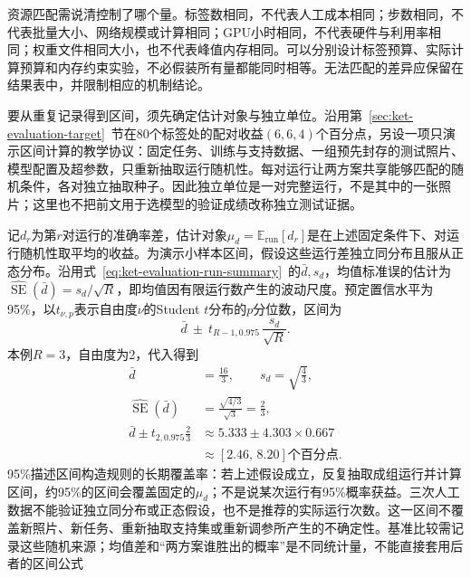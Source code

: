资源匹配需说清控制了哪个量。标签数相同，不代表人工成本相同；步数相同，不代表批量大小、网络规模或计算相同；GPU小时相同，不代表硬件与利用率相同；权重文件相同大小，也不代表峰值内存相同。可以分别设计标签预算、实际计算预算和内存约束实验，不必假装所有量都能同时相等。无法匹配的差异应保留在结果表中，并限制相应的机制结论。

要从重复记录得到区间，须先确定估计对象与独立单位。沿用第~\ref{sec:ket-evaluation-target}~节在80个标签处的配对收益$(6,6,4)$个百分点，另设一项只演示区间计算的教学协议：固定任务、训练与支持数据、一组预先封存的测试照片、模型配置及超参数，只重新抽取运行随机性。每对运行让两方案共享能够匹配的随机条件，各对独立抽取种子。因此独立单位是一对完整运行，不是其中的一张照片；这里也不把前文用于选模型的验证成绩改称独立测试证据。

记$d_r$为第$r$对运行的准确率差，估计对象$\mu_d=\mathbb E_{\mathrm{run}}[d_r]$是在上述固定条件下、对运行随机性取平均的收益。为演示小样本区间，假设这些运行差独立同分布且服从正态分布。沿用式~\eqref{eq:ket-evaluation-run-summary}~的$\bar d,s_d$，均值标准误的估计为$\widehat{\operatorname{SE}}(\bar d)=s_d/\sqrt R$，即均值因有限运行数产生的波动尺度。预定置信水平为95\%，以$t_{\nu,p}$表示自由度$\nu$的Student $t$分布的$p$分位数，区间为
\begin{equation}
  \bar d\ \pm\ t_{R-1,0.975}\,
    \frac{s_d}{\sqrt R}.
  \label{eq:ket-evaluation-paired-interval}
\end{equation}
本例$R=3$，自由度为2，代入得到
\[
  \begin{aligned}
    \bar d&=\frac{16}{3},\qquad s_d=\sqrt{\frac43},\\
    \widehat{\operatorname{SE}}(\bar d)&=\frac{\sqrt{4/3}}{\sqrt3}
      =\frac23,\\
    \bar d\pm t_{2,0.975}\frac23
      &\approx5.333\pm4.303\times0.667\\
      &\approx[2.46,\,8.20]\text{个百分点}.
  \end{aligned}
\]
95\%描述区间构造规则的长期覆盖率：若上述假设成立，反复抽取成组运行并计算区间，约95\%的区间会覆盖固定的$\mu_d$；不是说某次运行有95\%概率获益。三次人工数据不能验证独立同分布或正态假设，也不是推荐的实际运行次数。这一区间不覆盖新照片、新任务、重新抽取支持集或重新调参所产生的不确定性。基准比较需记录这些随机来源；均值差和“两方案谁胜出的概率”是不同统计量，不能直接套用后者的区间公式

